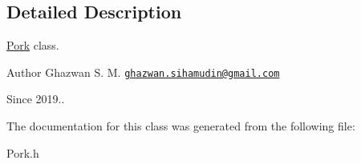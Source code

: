 \subsection{Detailed Description}
\hyperlink{classPork}{Pork} class.

\begin{DoxyAuthor}{Author}
Ghazwan S. M. \href{mailto:ghazwan.sihamudin@gmail.com}{\tt ghazwan.\+sihamudin@gmail.\+com} 
\end{DoxyAuthor}
\begin{DoxySince}{Since}
2019.. 
\end{DoxySince}


The documentation for this class was generated from the following file\+:\begin{DoxyCompactItemize}
\item 
Pork.\+h\end{DoxyCompactItemize}
